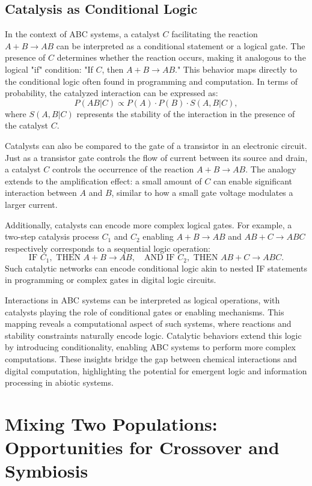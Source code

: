 \documentclass[entropy,article,submit,pdftex,moreauthors]{Definitions/mdpi}
\begin{document}
\subsection{Catalysis as Conditional Logic}

In the context of ABC systems, a catalyst \( C \) facilitating the reaction \( A + B \to AB \) can be interpreted as a conditional statement or a logical gate. The presence of \( C \) determines whether the reaction occurs, making it analogous to the logical "if" condition: "If \( C \), then \( A + B \to AB \)."
This behavior maps directly to the conditional logic often found in programming and computation. In terms of probability, the catalyzed interaction can be expressed as:
\[
P(AB | C) \propto P(A) \cdot P(B) \cdot S(A, B | C),
\]
where \( S(A, B | C) \) represents the stability of the interaction in the presence of the catalyst \( C \).

Catalysts can also be compared to the gate of a transistor in an electronic circuit. Just as a transistor gate controls the flow of current between its source and drain, a catalyst \( C \) controls the occurrence of the reaction \( A + B \to AB \). The analogy extends to the amplification effect: a small amount of \( C \) can enable significant interaction between \( A \) and \( B \), similar to how a small gate voltage modulates a larger current.

Additionally, catalysts can encode more complex logical gates. For example, a two-step catalysis process \( C_1 \) and \( C_2 \) enabling \( A + B \to AB \) and \( AB + C \to ABC \) respectively corresponds to a sequential logic operation:
\[
\text{IF } C_1, \text{ THEN } A + B \to AB, \quad \text{AND IF } C_2, \text{ THEN } AB + C \to ABC.
\]
Such catalytic networks can encode conditional logic akin to nested IF statements in programming or complex gates in digital logic circuits. 

Interactions in ABC systems can be interpreted as logical operations, with catalysts playing the role of conditional gates or enabling mechanisms. This mapping reveals a computational aspect of such systems, where reactions and stability constraints naturally encode logic. Catalytic behaviors extend this logic by introducing conditionality, enabling ABC systems to perform more complex computations. These insights bridge the gap between chemical interactions and digital computation, highlighting the potential for emergent logic and information processing in abiotic systems.


\section{Mixing Two Populations: Opportunities for Crossover and Symbiosis}
\end{document}
